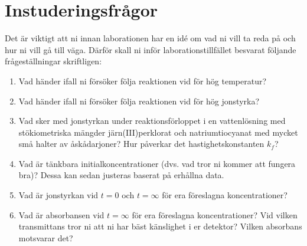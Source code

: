 \section{Instuderingsfrågor}
\label{sec:instudering}
Det är viktigt att ni innan laborationen har en idé om vad ni vill ta
reda på och hur ni vill gå till väga. Därför skall ni inför
laborationstillfället besvarat följande frågeställningar skriftligen:

\begin{enumerate}
\item Vad händer ifall ni försöker följa reaktionen vid för hög
  temperatur?
\item Vad händer ifall ni försöker följa reaktionen vid för hög
  jonstyrka?
\item Vad sker med jonstyrkan under reaktionsförloppet i en vattenlösning
  med stökiometriska mängder järn(III)perklorat och natriumtiocyanat med
  mycket små halter av åskådarjoner? Hur påverkar det
  hastighetskonstanten $k_f$?
\item Vad är tänkbara initialkoncentrationer (dvs. vad tror ni kommer att
  fungera bra)? Dessa kan sedan justeras baserat på erhållna data.
\item Vad är jonstyrkan vid $t=0$ och $t=\infty$ för era föreslagna
  koncentrationer?
\item Vad är absorbansen vid $t=\infty$ för era föreslagna
  koncentrationer? Vid vilken transmittans tror ni att ni har bäst
  känslighet i er detektor? Vilken absorbans motsvarar det?
\end{enumerate}

